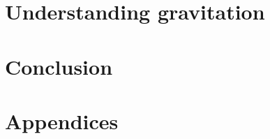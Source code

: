 \documentclass[a4paper, 11pt, titlepage, twoside]{book}
\begin{document}
\part{Understanding gravitation}\label{pt:grav}





\part{Conclusion}



\appendix
\part{Appendices}













\backmatter

{}



\end{document}
